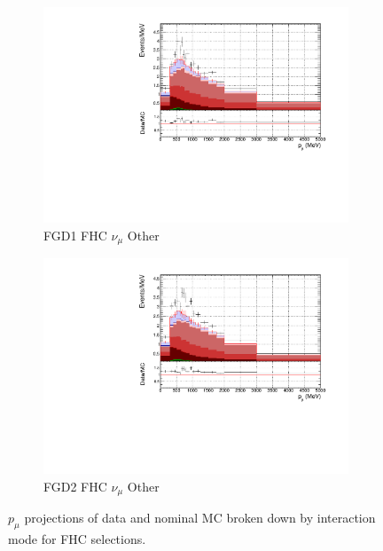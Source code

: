 \begin{figure}[!h]
\begin{subfigure}{0.49\textwidth}
  \centering
  \includegraphics[width=\textwidth]{figs/FGD1_numuCC_other_p}
  \caption{FGD1 FHC $\nu_{\mu}$ Other}
\end{subfigure}
\begin{subfigure}{0.49\textwidth}
  \centering
  \includegraphics[width=\textwidth]{figs/FGD2_numuCC_other_p}
  \caption{FGD2 FHC $\nu_{\mu}$ Other}
\end{subfigure}
\caption{$p_{\mu}$ projections of data and nominal MC broken down by interaction mode for FHC selections.}
\label{fig:pstack_fhc}
\end{figure}

